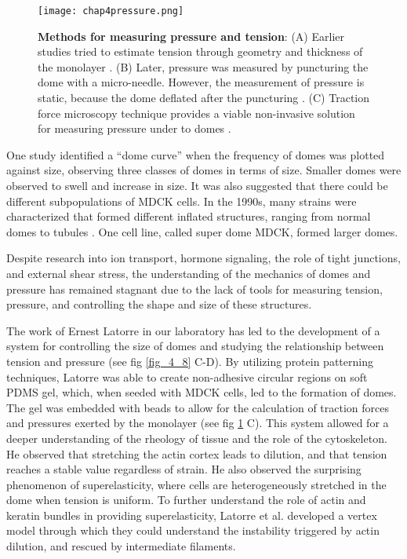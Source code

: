 \begin{figure}
	\centering
	\texttt{[image: chap4pressure.png]}
	\caption{\label{fig_4_9} \textbf{Methods for measuring pressure and tension}: (A) Earlier studies tried to estimate tension through geometry and thickness of the monolayer \cite{tanner1983}. (B) Later, pressure was measured by puncturing the dome with a micro-needle. However, the measurement of pressure is static, because the dome deflated after the puncturing \cite{choudhury2022}. (C) Traction force microscopy technique provides a viable non-invasive solution for measuring pressure under to domes \cite{latorre2018}.
	}
\end{figure}

One study \cite{popowicz1986} identified a ``dome curve'' when the frequency of domes was plotted against size, observing three classes of domes in terms of size. Smaller domes were observed to swell and increase in size. It was also suggested that there could be different subpopulations of MDCK cells. In the 1990s, many strains were characterized that formed different inflated structures, ranging from normal domes to tubules \cite{klebe1995}. One cell line, called super dome MDCK, formed larger domes.

Despite research into ion transport, hormone signaling, the role of tight junctions, and external shear stress, the understanding of the mechanics of domes and pressure has remained stagnant due to the lack of tools for measuring tension, pressure, and controlling the shape and size of these structures.

The work of Ernest Latorre in our laboratory has led to the development of a system for controlling the size of domes and studying the relationship between tension and pressure \cite{latorre2018} (see fig \ref{fig_4_8} C-D). By utilizing protein patterning techniques, Latorre was able to create non-adhesive circular regions on soft PDMS gel, which, when seeded with MDCK cells, led to the formation of domes. The gel was embedded with beads to allow for the calculation of traction forces and pressures exerted by the monolayer (see  fig \ref{fig_4_9} C). This system allowed for a deeper understanding of the rheology of tissue and the role of the cytoskeleton. He observed that stretching the actin cortex leads to dilution, and that tension reaches a stable value regardless of strain. He also observed the surprising phenomenon of superelasticity, where cells are heterogeneously stretched in the dome when tension is uniform. To further understand the role of actin and keratin bundles in providing superelasticity, Latorre et al. developed a vertex model through which they could understand the instability triggered by actin dilution, and rescued by intermediate filaments.

